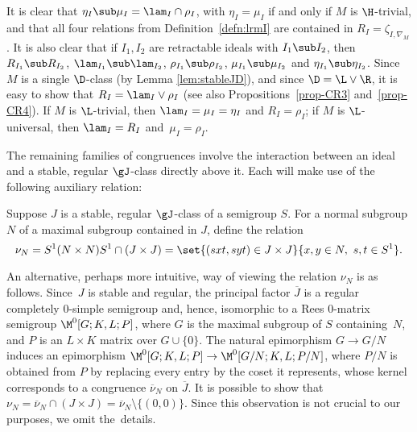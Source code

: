 It is clear that $\eta_I\sub\mu_I=\lam_I\cap\rho_I$, with $\eta_I=\mu_I$ if and only if $M$ is $\H$-trivial, and that all four relations from Definition~\ref{defn:lrmI} are contained in $R_I=\zeta_{I,\nabla_M}$.  
It is also clear that if $I_1,I_2$ are retractable ideals with $I_1\sub I_2$, then $R_{I_1}\sub R_{I_2}$, $\lam_{I_1}\sub \lam_{I_2}$, $\rho_{I_1}\sub \rho_{I_2}$, $\mu_{I_1}\sub \mu_{I_2}$ and $\eta_{I_1}\sub \eta_{I_2}$.  Since $M$ is a single $\D$-class (by Lemma \ref{lem:stableJD}), and since ${\D}={\L}\vee{\R}$, it is easy to show that $R_I=\lam_I\vee\rho_I$ (see also Propositions~\ref{prop-CR3} and~\ref{prop-CR4}).  If $M$ is $\L$-trivial, then $\lam_I=\mu_I=\eta_I$ and $R_I=\rho_I$; if $M$ is $\L$-universal, then $\lam_I=R_I$ and~$\mu_I=\rho_I$.

The remaining families of congruences involve the interaction between an ideal and a stable, regular $\gJ$-class directly above it.  Each will make use of the following auxiliary relation:

\begin{defn}
\label{Rel-nu}
Suppose $J$ is a stable, regular $\gJ$-class of a semigroup $S$.  For a normal subgroup $N$ of a maximal subgroup contained in $J$, define the relation
\[
\nu_N = S^1(N\times N)S^1\cap(J\times J) = \set{ (sxt,syt)\in J\times J}{ x,y\in N,\ s,t\in S^1}.
\]
\end{defn}

An alternative, perhaps more intuitive, way of viewing the relation $\nu_N$ is
as follows.  
Since~$J$ is stable and regular, the principal factor $\overline{J}$ is a regular
completely $0$-simple semigroup and, hence, isomorphic to a Rees $0$-matrix
semigroup $\M^0[G;K,L; P]$, where $G$ is the maximal subgroup of $S$ containing~$N$, and $P$ is an $L\times K$ matrix over $G\cup\{0\}$.  The natural
epimorphism $G\rightarrow G/N$ induces an epimorphism ${\M^0[G;K,L;P]\rightarrow
\M^0[G/N;K,L;P/N]}$, where $P/N$ is obtained from $P$ by replacing every entry by
the coset it represents, whose kernel corresponds to a congruence
$\overline{\nu}_N$ on $\overline{J}$.  It is possible to show that
$\nu_N=\overline{\nu}_N\cap(J\times J)=\overline{\nu}_N\setminus\{(0,0)\}$.  Since this observation is not crucial to our purposes, we omit the~details.

